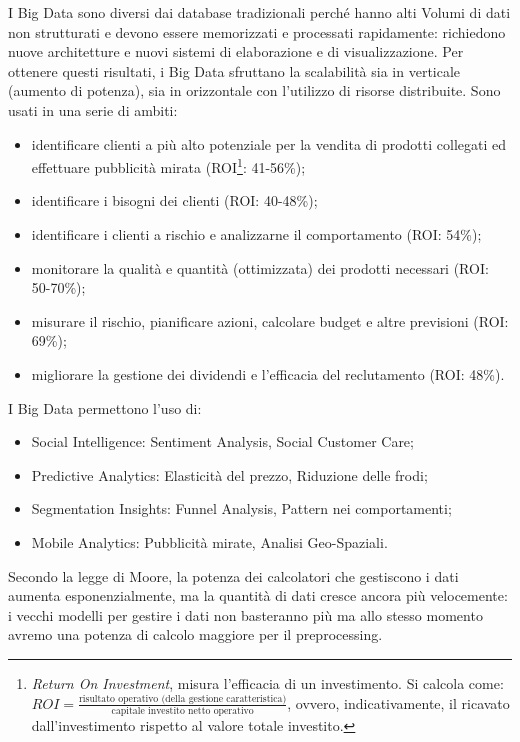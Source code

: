 \documentclass[a4page, 11pt]{article}
\begin{document}
I Big Data sono diversi dai database tradizionali perché hanno alti Volumi di dati non strutturati e devono essere memorizzati e processati rapidamente: richiedono nuove architetture e nuovi sistemi di elaborazione e di visualizzazione.
Per ottenere questi risultati, i Big Data sfruttano la scalabilità sia in verticale (aumento di potenza), sia in orizzontale con l'utilizzo di risorse distribuite. Sono usati in una serie di ambiti:
\begin{itemize}
  \item identificare clienti a più alto potenziale per la vendita di prodotti collegati ed effettuare pubblicità mirata (ROI\footnote{\textit{Return On Investment}, misura l'efficacia di un investimento. Si calcola come: $ROI = \frac{\text{risultato operativo (della gestione caratteristica)}}{\text{capitale investito netto operativo}}$, ovvero, indicativamente, il ricavato dall'investimento rispetto al valore totale investito.}: 41-56\%);
  \item identificare i bisogni dei clienti (ROI: 40-48\%);
  \item identificare i clienti a rischio e analizzarne il comportamento (ROI: 54\%);
  \item monitorare la qualità e quantità (ottimizzata) dei prodotti necessari (ROI: 50-70\%);
  \item misurare il rischio, pianificare azioni, calcolare budget e altre previsioni (ROI: 69\%);
  \item migliorare la gestione dei dividendi  e l'efficacia del reclutamento (ROI: 48\%).
\end{itemize}

I Big Data permettono l'uso di:
\begin{itemize}
  \item Social Intelligence: Sentiment Analysis, Social Customer Care;
  \item Predictive Analytics: Elasticità del prezzo, Riduzione delle frodi;
  \item Segmentation Insights: Funnel Analysis, Pattern nei comportamenti;
  \item Mobile Analytics: Pubblicità mirate, Analisi Geo-Spaziali.
\end{itemize}

Secondo la legge di Moore, la potenza dei calcolatori che gestiscono i dati aumenta esponenzialmente, ma la quantità di dati cresce ancora più velocemente: i vecchi modelli per gestire i dati non basteranno più ma allo stesso momento avremo una potenza di calcolo maggiore per il preprocessing. \newline
\end{document}
